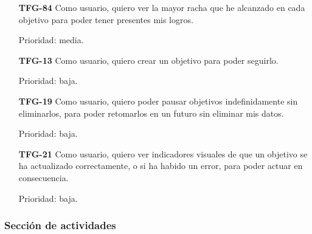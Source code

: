 \documentclass[10pt, a4paper]{aqademic}
\begin{document}
\begin{itemize}[leftmargin=16mm]
	\item [\textbf{TFG-84}] Como usuario, quiero ver la mayor racha que he alcanzado en cada objetivo para poder tener presentes mis logros.
	
	Prioridad: media.
	
	\item [\textbf{TFG-13}] Como usuario, quiero crear un objetivo para poder seguirlo.
	
	Prioridad: baja.
	
	\item [\textbf{TFG-19}] Como usuario, quiero poder pausar objetivos indefinidamente sin eliminarlos, para poder retomarlos en un futuro sin eliminar mis datos.
	
	Prioridad: baja.
	
	\item [\textbf{TFG-21}] Como usuario, quiero ver indicadores visuales de que un objetivo se ha actualizado correctamente, o si ha habido un error, para poder actuar en consecuencia.
	
	Prioridad: baja.
\end{itemize}


\subsubsection*{Sección de actividades}
\end{document}
